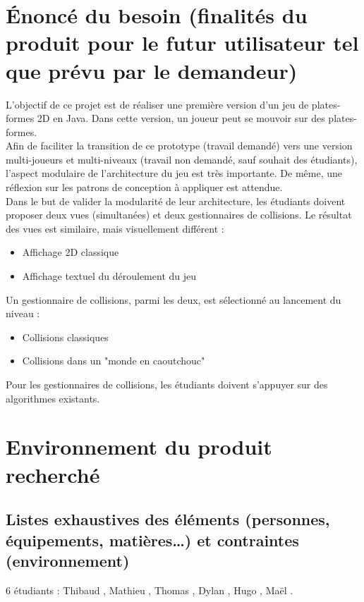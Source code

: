 \documentclass[11pt]{report}
\begin{document}
		\section{Énoncé du besoin (finalités du produit pour le futur utilisateur tel que prévu par le demandeur)}
		
			L'objectif de ce projet est de réaliser une première version d'un jeu de plates-formes 2D en Java. Dans cette version, un joueur peut se mouvoir sur des plates-formes.\\

			Afin de faciliter la transition de ce prototype (travail demandé) vers une version multi-joueurs et multi-niveaux (travail non demandé, sauf souhait des étudiants), l'aspect modulaire de l'architecture du jeu est très importante. De même, une réflexion sur les patrons de conception à appliquer est attendue.\\

			Dans le but de valider la modularité de leur architecture, les étudiants doivent proposer deux vues (simultanées) et deux gestionnaires de collisions. Le résultat des vues est similaire, mais visuellement différent :
			\begin{itemize}
			 	\item Affichage 2D classique
			 	\item Affichage textuel du déroulement du jeu
			 \end{itemize}
			 Un gestionnaire de collisions, parmi les deux, est sélectionné au lancement du niveau :
			 \begin{itemize}
				\item Collisions classiques
			 	\item Collisions dans un "monde en caoutchouc"
			 \end{itemize}
			 
			Pour les gestionnaires de collisions, les étudiants doivent s'appuyer sur des algorithmes existants.
		
		\section{Environnement du produit recherché}
		
			\subsection{Listes exhaustives des éléments (personnes, équipements, matières…) et contraintes (environnement)}
			
				6 étudiants : Thibaud , Mathieu , Thomas , Dylan , Hugo , Maël .
				
\end{document}
